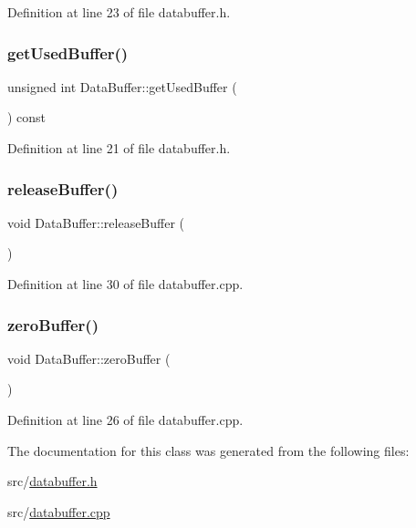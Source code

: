 Definition at line 23 of file databuffer.\+h.

\mbox{\label{class_data_buffer_a6f4e74b3e149556173b8fbd84d76111d}} 
\subsubsection{\texorpdfstring{getUsedBuffer()}{getUsedBuffer()}}
{\footnotesize\ttfamily unsigned int Data\+Buffer\+::get\+Used\+Buffer (\begin{DoxyParamCaption}{ }\end{DoxyParamCaption}) const\hspace{0.3cm}{\ttfamily [inline]}}



Definition at line 21 of file databuffer.\+h.

\mbox{\label{class_data_buffer_a4ee5f10e8bb45c33011ca78d2b270785}} 
\subsubsection{\texorpdfstring{releaseBuffer()}{releaseBuffer()}}
{\footnotesize\ttfamily void Data\+Buffer\+::release\+Buffer (\begin{DoxyParamCaption}{ }\end{DoxyParamCaption})}



Definition at line 30 of file databuffer.\+cpp.

\mbox{\label{class_data_buffer_a2b0461459480fdac78e72372f9f140ce}} 
\subsubsection{\texorpdfstring{zeroBuffer()}{zeroBuffer()}}
{\footnotesize\ttfamily void Data\+Buffer\+::zero\+Buffer (\begin{DoxyParamCaption}{ }\end{DoxyParamCaption})}



Definition at line 26 of file databuffer.\+cpp.



The documentation for this class was generated from the following files\+:\begin{DoxyCompactItemize}
\item 
src/\mbox{\hyperlink{databuffer_8h}{databuffer.\+h}}\item 
src/\mbox{\hyperlink{databuffer_8cpp}{databuffer.\+cpp}}\end{DoxyCompactItemize}
